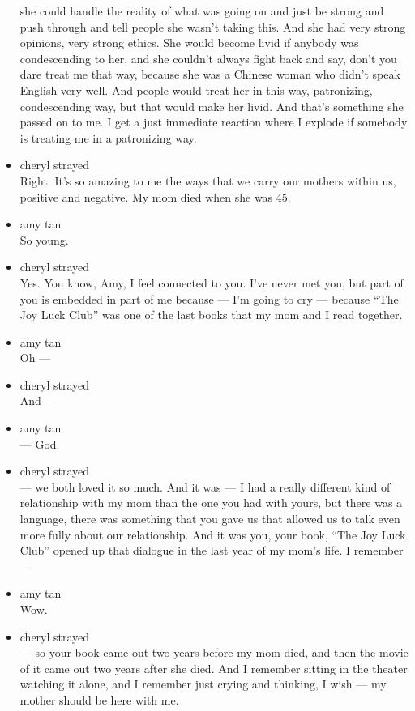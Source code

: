 \begin{itemize}
  she could handle the reality of what was going on and just be strong
  and push through and tell people she wasn't taking this. And she had
  very strong opinions, very strong ethics. She would become livid if
  anybody was condescending to her, and she couldn't always fight back
  and say, don't you dare treat me that way, because she was a Chinese
  woman who didn't speak English very well. And people would treat her
  in this way, patronizing, condescending way, but that would make her
  livid. And that's something she passed on to me. I get a just
  immediate reaction where I explode if somebody is treating me in a
  patronizing way.
\item
  cheryl strayed\\
  Right. It's so amazing to me the ways that we carry our mothers within
  us, positive and negative. My mom died when she was 45.
\item
  amy tan\\
  So young.
\item
  cheryl strayed\\
  Yes. You know, Amy, I feel connected to you. I've never met you, but
  part of you is embedded in part of me because --- I'm going to cry ---
  because ``The Joy Luck Club'' was one of the last books that my mom
  and I read together.
\item
  amy tan\\
  Oh ---
\item
  cheryl strayed\\
  And ---
\item
  amy tan\\
  --- God.
\item
  cheryl strayed\\
  --- we both loved it so much. And it was --- I had a really different
  kind of relationship with my mom than the one you had with yours, but
  there was a language, there was something that you gave us that
  allowed us to talk even more fully about our relationship. And it was
  you, your book, ``The Joy Luck Club'' opened up that dialogue in the
  last year of my mom's life. I remember ---
\item
  amy tan\\
  Wow.
\item
  cheryl strayed\\
  --- so your book came out two years before my mom died, and then the
  movie of it came out two years after she died. And I remember sitting
  in the theater watching it alone, and I remember just crying and
  thinking, I wish --- my mother should be here with me.

\end{itemize}
